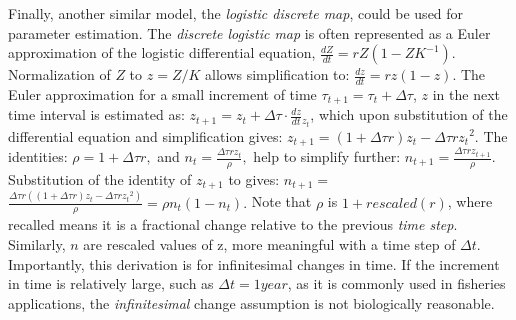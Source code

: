 \documentclass[
	letterpaper, %
	10pt, %
]{article}
\begin{document}
\begin{appendices}
Finally, another similar model, the \emph{logistic discrete map}, could
be used for parameter estimation. The \emph{discrete logistic map}
is often represented as a Euler approximation of the logistic differential
equation, 
${\frac{\mathit{dZ}}{\mathit{dt}}=r}Z{({{1-Z}K^{-1}})}$. Normalization of 
$Z$ to 
$z={Z/K}$ allows simplification to: 
${\frac{\mathit{dz}}{\mathit{dt}}=r}z{({1-z})}.$ The Euler approximation for a small increment of time 
${\tau_{t+1}={\tau_{t}+\Delta}}\tau$, 
$z$ in the next time interval is estimated as: 
${z_{t+1}={z_{t}+\Delta}}\tau\cdot\frac{\mathit{dz}}{\mathit{dt}}{}_{z_{t}}$, which upon substitution of the differential equation and simplification
gives: 
${z_{t+1}={({{1+\Delta}\tau r})}}{z_{t}-\Delta}\tau r{z_{t}}^{2}$. The identities: 
${\rho={1+\Delta}}\tau r,$ and 
${n_{t}=\frac{\Delta\tau rz_{t}}{\rho}},$ help to simplify further: 
${n_{t+1}=\frac{\Delta\tau rz_{t+1}}{\rho}}.$ Substitution of the identity of 
$z_{t+1}$ to gives: 
$n_{t+1}={}$ ${\frac{\Delta\tau r{({{({{1+\Delta}\tau r})}{z_{t}-\Delta}\tau r{z_{t}}^{2}})}}{\rho}=\rho}n_{t}{({1-n_{t}})}.$ Note that 
$\rho$ is 
${1+\mathit{rescaled}}{(r)}$, where recalled means it is a fractional change relative to the previous \emph{time step}. Similarly, 
$n$ are rescaled values of z, more meaningful with a time step of 
$\Delta t$. Importantly, this derivation is for infinitesimal changes in time.
If the increment in time is relatively large, such as 
$\Delta{t=1}\mathit{year}$, as it is commonly used in fisheries applications, the \emph{infinitesimal} change assumption is not biologically reasonable.
 
\end{appendices}
\end{document}
